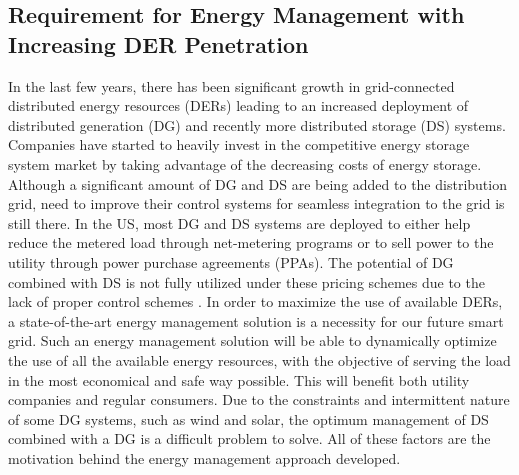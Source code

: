 \subsection{Requirement for Energy Management with Increasing DER Penetration}
In the last few years, there has been significant growth in grid-connected distributed energy resources (DERs) leading to an increased deployment of distributed generation (DG) and recently more distributed storage (DS) systems. Companies have started to heavily invest in the competitive energy storage system market by taking advantage of the decreasing costs of energy storage. Although a significant amount of DG and DS are being added to the distribution grid, need to improve their control systems for seamless integration to the grid is still there. In the US, most DG and DS systems are deployed to either help reduce the metered load through net-metering programs or to sell power to the utility through power purchase agreements (PPAs). The potential of DG combined with DS is not fully utilized under these pricing schemes due to the lack of proper control schemes \cite{CONF_1}. In order to maximize the use of available DERs, a state-of-the-art energy management solution is a necessity for our future smart grid. Such an energy management solution will be able to dynamically optimize the use of all the available energy resources, with the objective of serving the load in the most economical and safe way possible. This will benefit both utility companies and regular consumers. Due to the constraints and intermittent nature of some DG systems, such as wind and solar, the optimum management of DS combined with a DG is a difficult problem to solve. All of these factors are the motivation behind the energy management approach developed.


